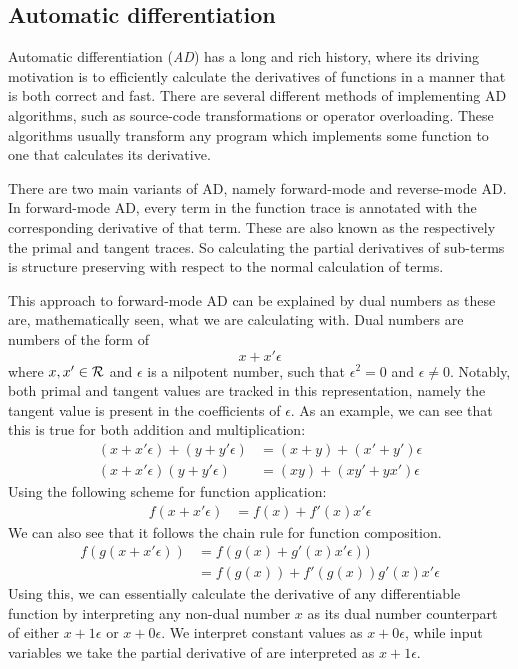 \subsection{Automatic differentiation}
Automatic differentiation (\textit{AD}) has a long and rich history, where its driving motivation is to efficiently calculate the derivatives of functions in a manner that is both correct and fast\cite{Baydin2015AutomaticDI}.
There are several different methods of implementing AD algorithms, such as source-code transformations or operator overloading.
These algorithms usually transform any program which implements some function to one that calculates its derivative.

There are two main variants of AD, namely forward-mode and reverse-mode AD.
In forward-mode AD, every term in the function trace is annotated with the corresponding derivative of that term.
These are also known as the respectively the primal and tangent traces.
So calculating the partial derivatives of sub-terms is structure preserving with respect to the normal calculation of terms.

This approach to forward-mode AD can be explained by dual numbers as these are, mathematically seen, what we are calculating with\cite{Baydin2015AutomaticDI}. Dual numbers are numbers of the form of
$$
  x + x' \epsilon
$$
where $x, x' \in \mathcal{R}$ and $\epsilon$ is a nilpotent number, such that $\epsilon^2 = 0$ and $\epsilon \neq 0$.
Notably, both primal and tangent values are tracked in this representation, namely the tangent value is present in the coefficients of $\epsilon$.
As an example, we can see that this is true for both addition and multiplication:
\begin{align*}
  (x + x' \epsilon) + (y + y' \epsilon) &= (x + y) + (x' + y')\epsilon \\
  (x + x' \epsilon)(y + y' \epsilon) &= (xy) + (xy' + yx')\epsilon
\end{align*}
Using the following scheme for function application:
\begin{align*}
  f(x + x' \epsilon) &= f(x) + f'(x)x'\epsilon
\end{align*}
We can also see that it follows the chain rule for function composition.
\begin{align*}
  f(g(x + x' \epsilon)) &= f(g(x) + g'(x)x'\epsilon)) \\
    &= f(g(x)) + f'(g(x))g'(x)x'\epsilon
\end{align*}
Using this, we can essentially calculate the derivative of any differentiable function by interpreting any non-dual number $x$ as its dual number counterpart of either $x + 1\epsilon$ or $x + 0\epsilon$. We interpret constant values as $x + 0\epsilon$, while input variables we take the partial derivative of are interpreted as $x + 1\epsilon$.

